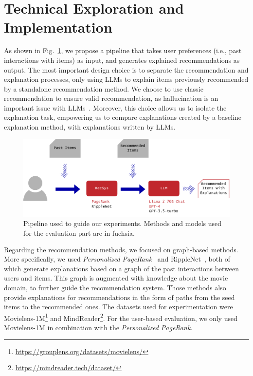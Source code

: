 \section{Technical Exploration and Implementation}

As shown in Fig.~\ref{fig:Pipeline}, we propose a pipeline that takes user preferences (i.e., past interactions with items) as input, and generates explained recommendations as output.
The most important design choice is to separate the recommendation and explanation processes, only using LLMs to explain items previously recommended by a standalone recommendation method. %
We choose to use classic recommendation to ensure valid recommendation, as hallucination is an important issue with LLMs~\cite{ji2023hallucination}. Moreover, this choice allows us to isolate the explanation task, empowering us to compare explanations created by a baseline explanation method, with explanations written by LLMs.

\begin{figure}[!ht]
    \centering
    \includegraphics[width=\linewidth]{images/Pipeline.pdf}
    \caption{Pipeline used to guide our experiments. Methods and models used for the evaluation part are in fuchsia.}
    \label{fig:Pipeline}
\end{figure}


Regarding the recommendation methods, we focused on graph-based methods. More specifically, we used \textit{Personalized PageRank}~\cite{haveliwala2003personalizedpagerank} and RippleNet~\cite{wang2018ripplenet}, both of which generate explanations based on a graph of the past interactions between users and items. This graph is augmented with knowledge about the movie domain, to further guide the recommendation system. %
Those methods also provide explanations for recommendations in the form of paths from the seed items to the recommended ones. The datasets used for experimentation were Movielens-1M\footnote{\url{https://grouplens.org/datasets/movielens/}} and MindReader\footnote{\url{https://mindreader.tech/dataset/}}. For the user-based evaluation, we only used Movielens-1M in combination with the \textit{Personalized PageRank}.

